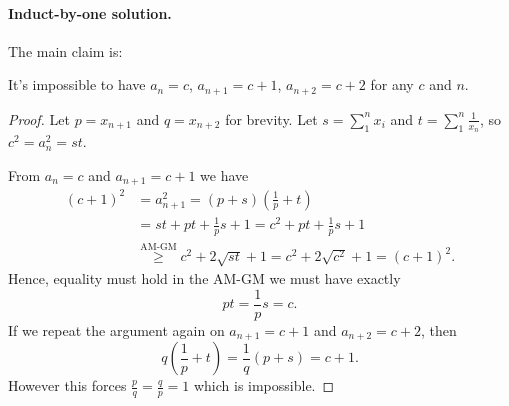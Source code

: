 \paragraph{Induct-by-one solution.}
The main claim is:
\begin{claim*}
  It's impossible to have
  $a_n = c$, $a_{n+1} = c+1$, $a_{n+2} = c+2$ for any $c$ and $n$.
\end{claim*}
\begin{proof}
  Let $p = x_{n+1}$ and $q = x_{n+2}$ for brevity.
  Let $s = \sum_1^n x_i$ and $t = \sum_1^n \frac{1}{x_n}$, so $c^2 = a_n^2 = st$.

  From $a_n = c$ and $a_{n+1} = c+1$ we have
  \begin{align*}
    (c+1)^2 &= a_{n+1}^2 = (p+s)\left( \frac 1p+t \right) \\
    &= st + pt + \frac1ps + 1 = c^2 + pt + \frac1ps + 1 \\
    &\overset{\text{AM-GM}}{\geq} c^2 + 2\sqrt{st} + 1 = c^2 + 2\sqrt{c^2} + 1 = (c+1)^2.
  \end{align*}
  Hence, equality must hold in the AM-GM we must have exactly
  \[ p t = \frac 1p s = c. \]
  If we repeat the argument again on $a_{n+1}=c+1$ and $a_{n+2}=c+2$, then
  \[ q \left( \frac 1p + t \right) = \frac 1q \left( p + s \right) = c + 1. \]
  However this forces $\frac pq = \frac qp = 1$ which is impossible.
\end{proof}
\pagebreak